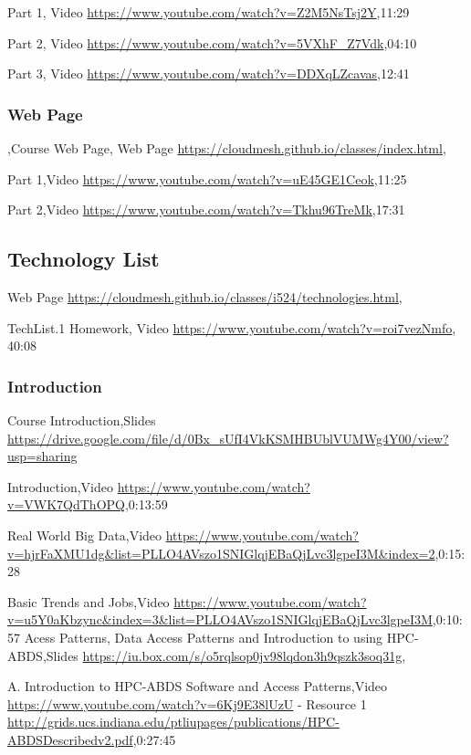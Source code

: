 Part 1, Video \url{https://www.youtube.com/watch?v=Z2M5NsTsj2Y},11:29

Part 2, Video \url{https://www.youtube.com/watch?v=5VXhF_Z7Vdk},04:10

Part 3, Video \url{https://www.youtube.com/watch?v=DDXqLZcavas},12:41

\subsubsection{Web Page}

,Course Web Page, Web Page \url{https://cloudmesh.github.io/classes/index.html},

Part 1,Video \url{https://www.youtube.com/watch?v=uE45GE1Ceok},11:25

Part 2,Video \url{https://www.youtube.com/watch?v=Tkhu96TreMk},17:31

\subsection{Technology List}

Web Page \url{https://cloudmesh.github.io/classes/i524/technologies.html}, 

TechList.1 Homework, Video \url{https://www.youtube.com/watch?v=roi7vezNmfo}, 40:08

\subsubsection{Introduction }

Course Introduction,Slides \url{https://drive.google.com/file/d/0Bx_sUfI4VkKSMHBUblVUMWg4Y00/view?usp=sharing}

Introduction,Video \url{https://www.youtube.com/watch?v=VWK7QdThOPQ},0:13:59

Real World Big Data,Video \url{https://www.youtube.com/watch?v=hjrFaXMU1dg&list=PLLO4AVszo1SNIGlqjEBaQjLvc3lgpeI3M&index=2},0:15:28

Basic Trends and Jobs,Video \url{https://www.youtube.com/watch?v=u5Y0aKbzync&index=3&list=PLLO4AVszo1SNIGlqjEBaQjLvc3lgpeI3M},0:10:57
Acess Patterns, Data Access Patterns and Introduction to using HPC-ABDS,Slides \url{https://iu.box.com/s/o5rqlsop0jv98lqdon3h9qszk3soq31g},

A. Introduction to HPC-ABDS Software and Access Patterns,Video \url{https://www.youtube.com/watch?v=6Kj9E38lUzU} -  Resource 1 \url{http://grids.ucs.indiana.edu/ptliupages/publications/HPC-ABDSDescribedv2.pdf},0:27:45

